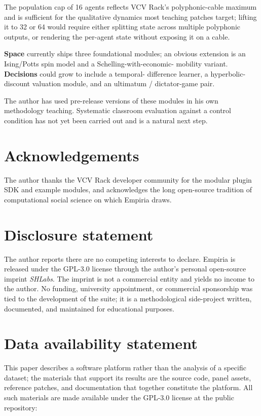 The population cap of 16 agents reflects VCV Rack's polyphonic-cable
maximum and is sufficient for the qualitative dynamics most teaching
patches target; lifting it to 32 or 64 would require either splitting
state across multiple polyphonic outputs, or rendering the per-agent
state without exposing it on a cable.

\textbf{Space} currently ships three foundational modules; an obvious
extension is an Ising/Potts spin model and a Schelling-with-economic-
mobility variant. \textbf{Decisions} could grow to include a temporal-
difference learner, a hyperbolic-discount valuation module, and an
ultimatum / dictator-game pair.

The author has used pre-release versions of these modules in his own
methodology teaching. Systematic classroom evaluation against a control
condition has not yet been carried out and is a natural next step.

\section{Acknowledgements}\label{acknowledgements}

The author thanks the VCV Rack developer community for the modular
plugin SDK and example modules, and acknowledges the long open-source
tradition of computational social science on which Empiria draws.

\section{Disclosure statement}\label{disclosure-statement}

The author reports there are no competing interests to declare. Empiria
is released under the GPL-3.0 license through the author's personal
open-source imprint \emph{SHLabs}. The imprint is not a commercial
entity and yields no income to the author. No funding, university
appointment, or commercial sponsorship was tied to the development of
the suite; it is a methodological side-project written, documented, and
maintained for educational purposes.

\section{Data availability statement}\label{data-availability-statement}

This paper describes a software platform rather than the analysis of a
specific dataset; the materials that support its results are the source
code, panel assets, reference patches, and documentation that together
constitute the platform. All such materials are made available under the
GPL-3.0 license at the public repository:

